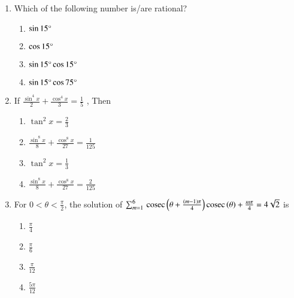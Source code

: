 \begin{enumerate}[label=\thesubsection.\arabic*,ref=\thesubsection.\theenumi]
\item Which of the following number is/are rational? \hfill{} 
\begin{enumerate}
    \item $\sin{15}\degree$
    \item $\cos{15}\degree$
    \item $\sin{15}\degree \cos{15}\degree$
    \item $\sin{15}\degree \cos{75}\degree$
\end{enumerate}
\item If $\frac{\sin^4{x}}{2}+\frac{\cos^4{x}}{3}=\frac{1}{5}$ , Then \hfill{} 
\begin{enumerate}
    \item $\tan^2{x}=\frac{2}{3}$
    \item $\frac{\sin^8{x}}{8}+\frac{\cos^8{x}}{27}=\frac{1}{125}$
    \item $\tan^2{x}=\frac{1}{3}$
    \item $\frac{\sin^8{x}}{8}+\frac{\cos^8{x}}{27}=\frac{2}{125}$
\end{enumerate}
\item For $ 0<\theta <\frac{\pi}{2}$, the solution of $\sum_{m=1}^{6}\,\text{cosec}\,{\left(\theta+\frac{\left(m-1\right)\pi}{4}\right)}\,\text{cosec}\,{{\left(\theta\right)+\frac{m\pi}{4}} }= 4\sqrt{2}$ is \hfill{}
\begin{enumerate}
    \item $\frac{\pi}{4}$
    \item $\frac{\pi}{6}$
    \item $\frac{\pi}{12}$
    \item $\frac{5\pi}{12}$
\end{enumerate}


\end{enumerate}
